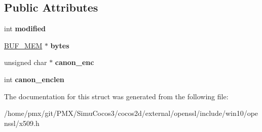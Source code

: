 \subsection*{Public Attributes}
\begin{DoxyCompactItemize}
\item 
\mbox{\label{structX509__name__st_a1bbfbc394e6971bc55d4f9ec4c22ae44}} 
int {\bfseries modified}
\item 
\mbox{\label{structX509__name__st_a673c31a6033851f510b2e74770f43224}} 
\hyperlink{structbuf__mem__st}{B\+U\+F\+\_\+\+M\+EM} $\ast$ {\bfseries bytes}
\item 
\mbox{\label{structX509__name__st_af5bcedafa7eb3039090945fec07a0ed7}} 
unsigned char $\ast$ {\bfseries canon\+\_\+enc}
\item 
\mbox{\label{structX509__name__st_a264a0973bed1cf3905e3f12b5af1d269}} 
int {\bfseries canon\+\_\+enclen}
\end{DoxyCompactItemize}


The documentation for this struct was generated from the following file\+:\begin{DoxyCompactItemize}
\item 
/home/pmx/git/\+P\+M\+X/\+Simu\+Cocos3/cocos2d/external/openssl/include/win10/openssl/x509.\+h\end{DoxyCompactItemize}
